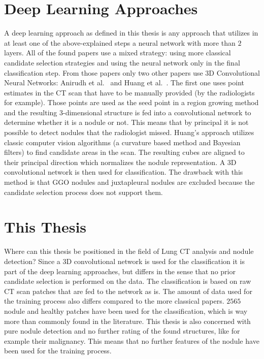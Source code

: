 \documentclass[main.tex]{subfiles}
\begin{document}
\section{Deep Learning Approaches}
A deep learning approach as defined in this thesis is any approach that utilizes in at least one of the above-explained steps a neural network with more than $2$ layers. All of the found papers use a mixed strategy: using more classical candidate selection strategies and using the neural network only in the final classification step. From those papers only two other papers use 3D Convolutional Neural Networks: Anirudh et al.~\cite{anirudh2016lung} and Huang et al.~\cite{huang2017lung}. The first one uses point estimates in the CT scan that have to be manually provided (by the radiologists for example). Those points are used as the seed point in a region growing method and the resulting 3-dimensional structure is fed into a convolutional network to determine whether it is a nodule or not. This means that by principal it is not possible to detect nodules that the radiologist missed. Huang's approach utilizes classic computer vision algorithms (a curvature based method and Bayesian filters) to find candidate areas in the scan. The resulting cubes are aligned to their principal direction which normalizes the nodule representation. A 3D convolutional network is then used for classification. The drawback with this method is that GGO nodules and juxtapleural nodules are excluded because the candidate selection process does not support them.


\section{This Thesis}
Where can this thesis be positioned in the field of Lung CT analysis and nodule detection? Since a 3D convolutional network is used for the classification it is part of the deep learning approaches, but differs in the sense that no prior candidate selection is performed on the data. The classification is based on raw CT scan patches that are fed to the network as is. The amount of data used for the training process also differs compared to the more classical papers. $2565$ nodule and healthy patches have been used for the classification, which is way more than commonly found in the literature. This thesis is also concerned with pure nodule detection and no further rating of the found structures, like for example their malignancy. This means that no further features of the nodule have been used for the training process.
\end{document}

